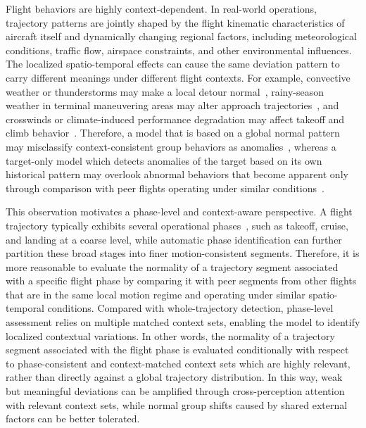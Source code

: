 \documentclass[iicol,pdflatex,sn-basic,Numbered]{sn-jnl}%
\theoremstyle{thmstyleone}%
\theoremstyle{thmstyletwo}%
\theoremstyle{thmstylethree}%
\begin{document}
Flight behaviors are highly context-dependent. 
In real-world operations, trajectory patterns are jointly shaped by the flight kinematic characteristics of aircraft itself and dynamically changing regional factors, including meteorological conditions, traffic flow, airspace constraints, and other environmental influences.
The localized spatio-temporal effects can cause the same deviation pattern to carry different meanings under different flight contexts.
For example, convective weather or thunderstorms may make a local detour normal~\cite{yang2024optimising}, rainy-season weather in terminal maneuvering areas may alter approach trajectories~\cite{chen2025impact}, and crosswinds or climate-induced performance degradation may affect takeoff and climb behavior~\cite{10.1145/3459104.3459109,williams2025quantifying,mcrae2021assessing}. 
Therefore, a model that is based on a global normal pattern may misclassify context-consistent group behaviors as anomalies~\cite{aerospace6110117,olive2020significant}, whereas a target-only model which detects anomalies of the target based on its own historical pattern may overlook abnormal behaviors that become apparent only through comparison with peer flights operating under similar conditions~\cite{chevrot2022cae,choi2023stochastic}.

This observation motivates a phase-level and context-aware perspective. 
A flight trajectory typically exhibits several operational phases~\cite{sun2017phaseidentification}, such as takeoff, cruise, and landing at a coarse level, while automatic phase identification can further partition these broad stages into finer motion-consistent segments. 
Therefore, it is more reasonable to evaluate the normality of a trajectory segment associated with a specific flight phase by comparing it with peer segments from other flights that are in the same local motion regime and operating under similar spatio-temporal conditions.
Compared with whole-trajectory detection, phase-level assessment relies on multiple matched context sets, enabling the model to identify localized contextual variations. 
In other words, the normality of a trajectory segment associated with the flight phase is evaluated conditionally with respect to phase-consistent and context-matched context sets which are highly relevant, rather than directly against a global trajectory distribution. 
In this way, weak but meaningful deviations can be amplified through cross-perception attention with relevant context sets, while normal group shifts caused by shared external factors can be better tolerated.
\end{document}
